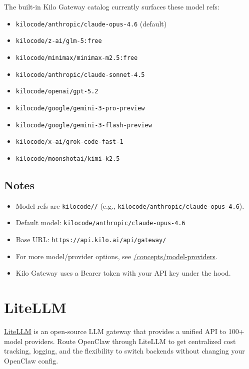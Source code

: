 The built-in Kilo Gateway catalog currently surfaces these model refs:

\begin{itemize}
  \item \texttt{kilocode/anthropic/claude-opus-4.6} (default)
  \item \texttt{kilocode/z-ai/glm-5:free}
  \item \texttt{kilocode/minimax/minimax-m2.5:free}
  \item \texttt{kilocode/anthropic/claude-sonnet-4.5}
  \item \texttt{kilocode/openai/gpt-5.2}
  \item \texttt{kilocode/google/gemini-3-pro-preview}
  \item \texttt{kilocode/google/gemini-3-flash-preview}
  \item \texttt{kilocode/x-ai/grok-code-fast-1}
  \item \texttt{kilocode/moonshotai/kimi-k2.5}
\end{itemize}


\subsection{Notes}


\begin{itemize}
  \item Model refs are \texttt{kilocode//} (e.g., \texttt{kilocode/anthropic/claude-opus-4.6}).
  \item Default model: \texttt{kilocode/anthropic/claude-opus-4.6}
  \item Base URL: \texttt{https://api.kilo.ai/api/gateway/}
  \item For more model/provider options, see \href{/concepts/model-providers}{/concepts/model-providers}.
  \item Kilo Gateway uses a Bearer token with your API key under the hood.
\end{itemize}



\clearpage

\section{LiteLLM}


\href{https://litellm.ai}{LiteLLM} is an open-source LLM gateway that provides a unified API to 100+ model providers. Route OpenClaw through LiteLLM to get centralized cost tracking, logging, and the flexibility to switch backends without changing your OpenClaw config.


